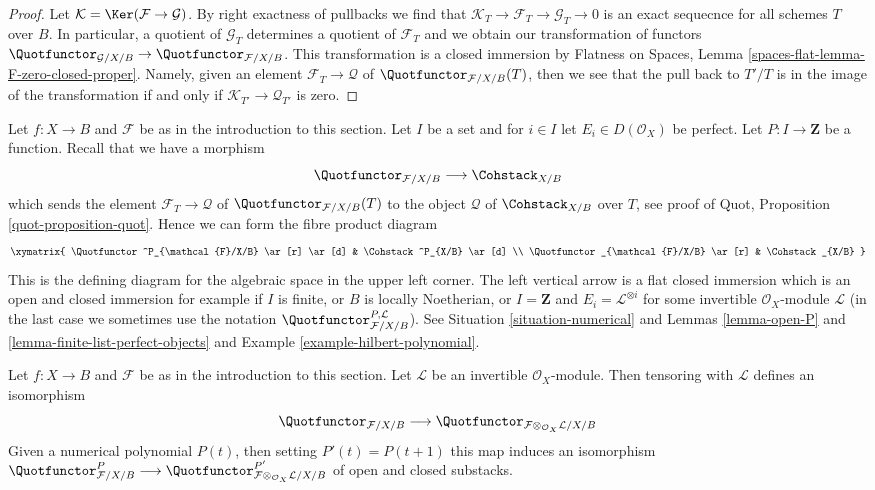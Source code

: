 \begin{proof}
Let $\mathcal{K} = \Ker(\mathcal{F} \to \mathcal{G})$. By right
exactness of pullbacks we find that
$\mathcal{K}_T \to \mathcal{F}_T \to \mathcal{G}_T \to 0$
is an exact sequecnce for all schemes $T$ over $B$.
In particular, a quotient of $\mathcal{G}_T$
determines a quotient of $\mathcal{F}_T$ and we obtain our transformation
of functors
$\Quotfunctor_{\mathcal{G}/X/B} \to \Quotfunctor_{\mathcal{F}/X/B}$.
This transformation is a closed immersion by
Flatness on Spaces, Lemma \ref{spaces-flat-lemma-F-zero-closed-proper}.
Namely, given an element $\mathcal{F}_T \to \mathcal{Q}$ of
$\Quotfunctor_{\mathcal{F}/X/B}(T)$, then we see that the pull
back to $T'/T$ is in the image of the transformation if and
only if $\mathcal{K}_{T'} \to \mathcal{Q}_{T'}$ is zero.
\end{proof}

\begin{remark}
\label{remark-quot-numerical}
Let $f : X \to B$ and $\mathcal{F}$ be as in the introduction to this section.
Let $I$ be a set and for $i \in I$ let $E_i \in D(\mathcal{O}_X)$ be perfect.
Let $P : I \to \mathbf{Z}$ be a function. Recall that we have a morphism
$$
\Quotfunctor_{\mathcal{F}/X/B} \longrightarrow \Cohstack_{X/B}
$$
which sends the element $\mathcal{F}_T \to \mathcal{Q}$
of $\Quotfunctor_{\mathcal{F}/X/B}(T)$ to the object $\mathcal{Q}$
of $\Cohstack_{X/B}$ over $T$, see proof of
Quot, Proposition \ref{quot-proposition-quot}. Hence we can form
the fibre product diagram
$$
\xymatrix{
\Quotfunctor^P_{\mathcal{F}/X/B} \ar[r] \ar[d] &
\Cohstack^P_{X/B} \ar[d] \\
\Quotfunctor_{\mathcal{F}/X/B} \ar[r] &
\Cohstack_{X/B}
}
$$
This is the defining diagram for the algebraic space in the
upper left corner. The left vertical arrow is a
flat closed immersion which is an open and closed immersion
for example if $I$ is finite, or $B$ is locally Noetherian, or
$I = \mathbf{Z}$ and $E_i = \mathcal{L}^{\otimes i}$ for some
invertible $\mathcal{O}_X$-module $\mathcal{L}$ (in the last
case we sometimes use the notation
$\Quotfunctor^{P, \mathcal{L}}_{\mathcal{F}/X/B}$).
See Situation \ref{situation-numerical} and
Lemmas \ref{lemma-open-P} and \ref{lemma-finite-list-perfect-objects} and
Example \ref{example-hilbert-polynomial}.
\end{remark}

\begin{lemma}
\label{lemma-quot-tensor-invertible}
Let $f : X \to B$ and $\mathcal{F}$ be as in the introduction to this section.
Let $\mathcal{L}$ be an invertible $\mathcal{O}_X$-module.
Then tensoring with $\mathcal{L}$ defines an isomorphism
$$
\Quotfunctor_{\mathcal{F}/X/B}
\longrightarrow
\Quotfunctor_{\mathcal{F} \otimes_{\mathcal{O}_X} \mathcal{L}/X/B}
$$
Given a numerical polynomial $P(t)$, then setting $P'(t) = P(t + 1)$
this map induces an isomorphism
$\Quotfunctor^P_{\mathcal{F}/X/B}
\longrightarrow
\Quotfunctor^{P'}_{\mathcal{F} \otimes_{\mathcal{O}_X} \mathcal{L}/X/B}$
of open and closed substacks.
\end{lemma}

